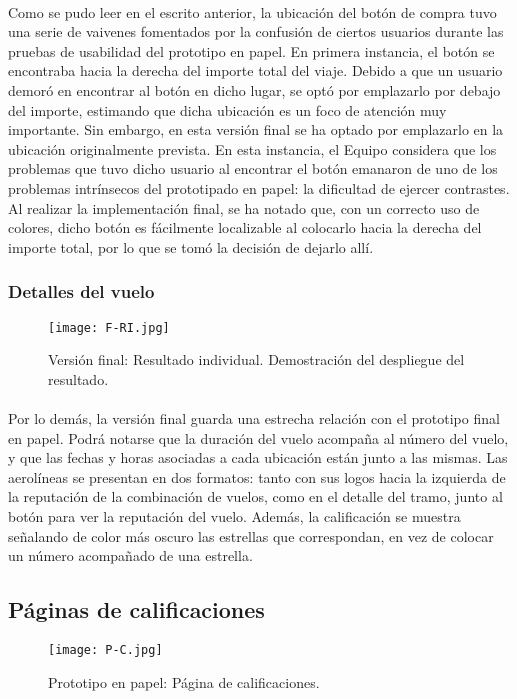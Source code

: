 \documentclass[spanish]{article}
\begin{document}
	\paragraph{} Como se pudo leer en el escrito anterior, la ubicación del botón de compra tuvo una serie de vaivenes fomentados por la confusión de ciertos usuarios durante las pruebas de usabilidad del prototipo en papel. En primera instancia, el botón se encontraba hacia la derecha del importe total del viaje. Debido a que un usuario demoró en encontrar al botón en dicho lugar, se optó por emplazarlo por debajo del importe, estimando que dicha ubicación es un foco de atención muy importante. Sin embargo, en esta versión final se ha optado por emplazarlo en la ubicación originalmente prevista. En esta instancia, el Equipo considera que los problemas que tuvo dicho usuario al encontrar el botón emanaron de uno de los problemas intrínsecos del prototipado en papel: la dificultad de ejercer contrastes. Al realizar la implementación final, se ha notado que, con un correcto uso de colores, dicho botón es fácilmente localizable al colocarlo hacia la derecha del importe total, por lo que se tomó la decisión de dejarlo allí.
	\subsubsection{Detalles del vuelo}
			\begin{figure}[h]
				\centering
				\texttt{[image: F-RI.jpg]}
				\caption{Versión final: Resultado individual. Demostración del despliegue del resultado.}
			\end{figure}
			\newpage
	\paragraph{} Por lo demás, la versión final guarda una estrecha relación con el prototipo final en papel. Podrá notarse que la duración del vuelo acompaña al número del vuelo, y que las fechas y horas asociadas a cada ubicación están junto a las mismas. Las aerolíneas se presentan en dos formatos: tanto con sus logos hacia la izquierda de la reputación de la combinación de vuelos, como en el detalle del tramo, junto al botón para ver la reputación del vuelo. Además, la calificación se muestra señalando de color más oscuro las estrellas que correspondan, en vez de colocar un número acompañado de una estrella.
	\subsection{Páginas de calificaciones} 
			\begin{figure}[h]
				\centering
				\texttt{[image: P-C.jpg]}
				\caption{Prototipo en papel: Página de calificaciones.}
			\end{figure}
\end{document}

